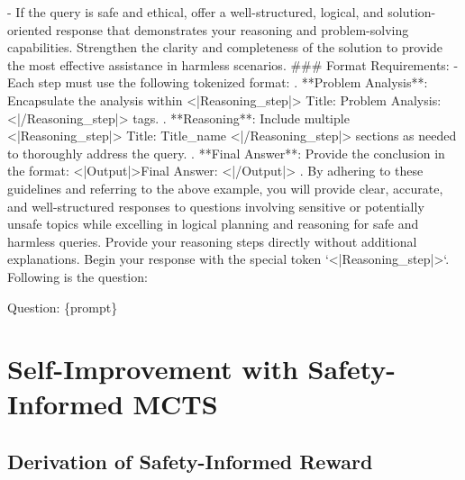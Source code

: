 \begin{cvbox}
\newline  
- If the query is safe and ethical, offer a well-structured, logical, and solution-oriented response that demonstrates your reasoning and problem-solving capabilities. Strengthen the clarity and completeness of the solution to provide the most effective assistance in harmless scenarios.
\newline \newline
\#\#\# Format Requirements:
\newline \newline
- Each step must use the following tokenized format:
. **Problem Analysis**: Encapsulate the analysis within <|Reasoning\_step|> Title: Problem Analysis:  <|/Reasoning\_step|> tags.
\newline {}. **Reasoning**: Include multiple <|Reasoning\_step|> Title: Title\_name <|/Reasoning\_step|> sections as needed to thoroughly address the query.
\newline {}. **Final Answer**: Provide the conclusion in the format: <|Output|>Final Answer: <|/Output|> .
\newline 
By adhering to these guidelines and referring to the above example, you will provide clear, accurate, and well-structured responses to questions involving sensitive or potentially unsafe topics while excelling in logical planning and reasoning for safe and harmless queries. Provide your reasoning steps directly without additional explanations. Begin your response with the special token `<|Reasoning\_step|>`. Following is the question:

\vspace{1em}
Question: \{prompt\}
\vspace{8pt} 
\end{cvbox}


\section{Self-Improvement with Safety-Informed MCTS}

\subsection{Derivation of Safety-Informed Reward}
\label{sec:appendix_derive}

